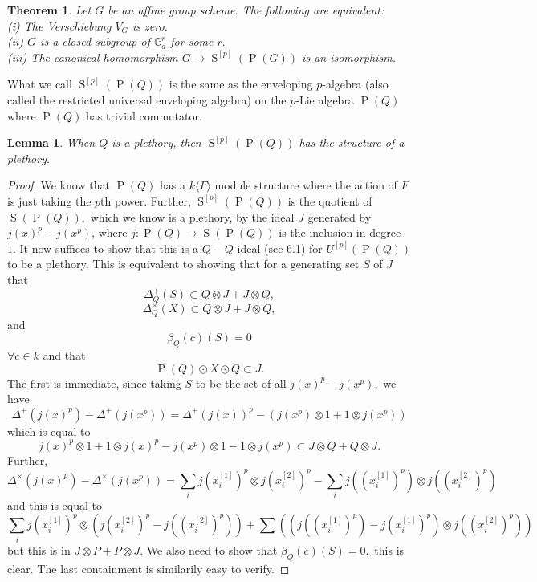 \documentclass[a4paper, 12pt]{amsart}
\DeclareMathOperator{\Prim}{P}
\DeclareMathOperator{\Sym}{S}
\numberwithin{equation}{section}
\newtheorem{lemma}[equation]{Lemma}
\newtheorem{theorem}{Theorem}[section]
\theoremstyle{definition}
\begin{document}
\begin{theorem}
Let $G$ be an affine group scheme. The following are equivalent: \\
(i) The Verschiebung $V_G$ is zero. \\
(ii) $G$ is a closed subgroup of $\mathbb{G}_a^r$ for some $r.$ \\
(iii) The canonical homomorphism $G \rightarrow \Sym^{[p]}(\Prim(G))$ is an isomorphism.
\end{theorem}
\begin{remark}
What we call $\Sym^{[p]}(\Prim(Q))$ is the same as the enveloping $p$-algebra (also called the restricted universal enveloping algebra) on the $p$-Lie algebra $\Prim(Q)$ where $\Prim(Q)$ has trivial commutator.
\end{remark}
\begin{lemma}
When $Q$ is a plethory, then $\Sym^{[p]}(\Prim(Q))$ has the structure of a plethory.
\end{lemma}
\begin{proof}
We know that $\Prim(Q)$ has a $k\langle F \rangle$ module structure where the action of $F$ is just taking the $p$th power. Further, $\Sym^{[p]}(\Prim(Q))$ is the quotient of $\Sym(\Prim(Q)),$  which we know is a plethory, by the ideal $J$ generated by $j(x)^{p}-j(x^p)$, where $j:\Prim(Q) \rightarrow \Sym(\Prim(Q))$ is the inclusion in degree $1.$ It now suffices to show that this is a $Q-Q$-ideal (see \cite{BW} 6.1) for $U^{[p]}(\Prim(Q))$ to be a plethory. This is equivalent to showing that for a generating set $S$ of $J$ that $$\Delta^+_Q(S) \subset Q \otimes J + J \otimes Q,$$  $$\Delta_Q^{\times}(X) \subset Q \otimes J + J \otimes Q,$$ and $$\beta_Q(c)(S)=0$$  $\forall c \in k$ and that $$\Prim(Q) \odot X \odot Q \subset J.$$ The first is immediate, since taking $S$ to be the set of all $j(x)^{p}-j(x^p),$ we have $$\Delta^+(j(x)^{p})-\Delta^+(j(x^p)) = \Delta^+(j(x))^{p}-(j(x^p) \otimes 1 + 1 \otimes j(x^p))$$ which is equal to $$j(x)^{p} \otimes 1 + 1 \otimes j(x)^{p}  -j(x^p) \otimes 1 - 1 \otimes j(x^p) \subset J \otimes Q + Q \otimes J.$$ Further, $$\Delta^\times(j(x)^{p})-\Delta^\times(j(x^p)) = \sum_i j(x_i^{[1]})^{p} \otimes j(x_i^{[2]})^{p} - \sum_i j((x_i^{[1]})^p) \otimes j((x_i^{[2]})^p)$$  and this is equal to $$\sum_ij(x_i^{[1]})^{p} \otimes (j(x_i^{[2]})^{p}-j((x_i^{[2]})^p)) + \sum ((j((x_i^{[1]})^p)-j(x_i^{[1]})^p) \otimes j((x_i^{[2]})^p))$$ but this is in $J \otimes P + P \otimes J.$  We also need to show that $\beta_Q(c)(S)=0,$ this is clear.  The last containment is similarily easy to verify.
\end{proof}
\end{document}
